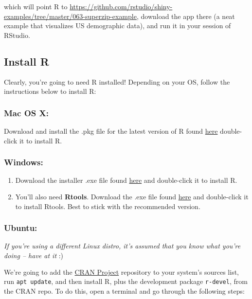\documentclass[]{book}
\begin{document}
which will point R to
\url{https://github.com/rstudio/shiny-examples/tree/master/063-superzip-example},
download the app there (a neat example that visualizes US demographic
data), and run it in your session of RStudio.

\subsection{Install R}\label{install-r}

Clearly, you're going to need R installed! Depending on your OS, follow
the instructions below to install R:

\subsubsection{\texorpdfstring{\textbf{Mac OS
X}:}{Mac OS X:}}\label{mac-os-x}

Download and install the .pkg file for the latest version of R found
\href{https://cran.r-project.org/bin/macosx/}{here} double-click it to
install R.

\subsubsection{\texorpdfstring{\textbf{Windows}:}{Windows:}}\label{windows}

\begin{enumerate}
\def\labelenumi{\arabic{enumi}.}
\item
  Download the installer .exe file found
  \href{https://cran.r-project.org/bin/windows/base/}{here} and
  double-click it to install R.
\item
  You'll also need \textbf{Rtools}. Download the .exe file found
  \href{https://cran.r-project.org/bin/windows/Rtools/}{here} and
  double-click it to install Rtools. Best to stick with the recommended
  version.
\end{enumerate}

\subsubsection{\texorpdfstring{\textbf{Ubuntu}:}{Ubuntu:}}\label{ubuntu}

\emph{If you're using a different Linux distro, it's assumed that you
know what you're doing -- have at it} :)

We're going to add the \href{https://cran.r-project.org/}{CRAN Project}
repository to your system's sources list, run \texttt{apt\ update}, and
then install R, plus the development package \texttt{r-devel}, from the
CRAN repo. To do this, open a terminal and go through the following
steps:
\end{document}
